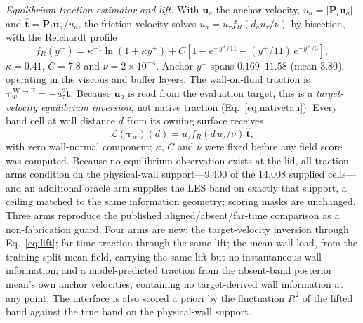 \emph{Equilibrium traction estimator and lift.} With $\mathbf u_a$ the anchor velocity,
$u_a=|\mathbf P_t\mathbf u_a|$ and $\hat{\mathbf t}=\mathbf P_t\mathbf u_a/u_a$, the friction
velocity solves $u_a=u_\tau f_R(d_a u_\tau/\nu)$ by bisection, with the Reichardt profile
\begin{equation}
f_R(y^+)=\kappa^{-1}\ln(1+\kappa y^+)
+C\left[1-e^{-y^+/11}-(y^+/11)\,e^{-y^+/3}\right],
\label{eq:reichardt}
\end{equation}
$\kappa=0.41$, $C=7.8$ and $\nu=2\times10^{-4}$. Anchor $y^+$ spans $0.169$--$11.58$ (mean
$3.80$), operating in the viscous and buffer layers. The wall-on-fluid traction is
$\boldsymbol\tau_w^{\,\mathrm{W\to F}}=-u_\tau^2\hat{\mathbf t}$. Because $\mathbf u_a$ is read
from the evaluation target, this is a \emph{target-velocity equilibrium inversion}, not native
traction (Eq.~\eqref{eq:nativetau}). Every band cell at wall distance $d$ from its owning surface
receives
\begin{equation}
\mathcal L(\boldsymbol\tau_w)(d)=u_\tau f_R(d\,u_\tau/\nu)\,\hat{\mathbf t},
\label{eq:lift}
\end{equation}
with zero wall-normal component; $\kappa$, $C$ and $\nu$ were fixed before any field score was
computed. Because no equilibrium observation exists at the lid, all traction arms condition on the
physical-wall support---9{,}400 of the 14{,}008 supplied cells---and an additional oracle arm
supplies the LES band on exactly that support, a ceiling matched to the same information geometry;
scoring masks are unchanged. Three arms reproduce the published aligned/absent/far-time comparison
as a non-fabrication guard. Four arms are new: the target-velocity inversion through
Eq.~\eqref{eq:lift}; far-time traction through the same lift; the mean wall load, from the
training-split mean field, carrying the same lift but no instantaneous wall information; and a
model-predicted traction from the absent-band posterior mean's own anchor velocities, containing
no target-derived wall information at any point. The interface is also scored a priori by the
fluctuation $R^2$ of the lifted band against the true band on the physical-wall support.

